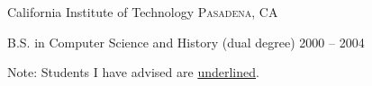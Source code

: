 \documentclass[10pt,a4paper]{article} %
\begin{document}
\headedsection %
{California Institute of Technology}
{\textsc{Pasadena, CA}} {

\headedsubsection %
{B.S. in Computer Science and History (dual degree)}
{2000 -- 2004} {}
}

\spacedhrule{0.5em}{-0.4em} %



\inlineheadsection %
{Note:}
{Students I have advised are \underline{underlined}.}
\end{document}
